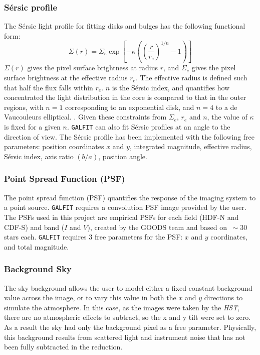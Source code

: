 \documentclass[11pt,twocolumn]{article}
\begin{document}
\subsubsection{S\'{e}rsic profile}\label{parfitting}
The S\'{e}rsic light profile for fitting disks and bulges has the following functional form: 
\begin{equation}
\Sigma(r) = \Sigma_e \exp \left[ -\kappa \left( \left(  \frac{r}{r_e} \right)^{1/n} - 1 \right) \right]
\end{equation}
$\Sigma(r)$ gives the pixel surface brightness at radius $r$, and $\Sigma_e$ gives the pixel surface brightness at the effective radius $r_e$. The effective radius is defined such that half the flux falls within $r_e$. $n$ is the S\'{e}rsic index, and quantifies how concentrated the light distribution in the core is compared to that in the outer regions, with $n=1$ corresponding to an exponential disk, and $n=4$ to a de Vaucouleurs elliptical.\cite{Peng:2002ua} . Given these constraints from  $\Sigma_e$, $r_e$ and $n$, the value of $\kappa$ is fixed for a given $n$. {\tt GALFIT} can also fit S\'{e}rsic profiles at an angle to the direction of view. The S\'{e}rsic profile has been implemented with the following free parameters: position coordinates $x$ and $y$, integrated magnitude, effective radius, S\'{e}rsic index, axis ratio $(b/a)$, position angle. 

\subsubsection{Point Spread Function (PSF) }\label{psf}
The point spread function (PSF) quantifies the response of the imaging system to a point source. {\tt GALFIT} requires a convolution PSF image provided by the user. The PSFs used in this project are empirical PSFs for each field (HDF-N and CDF-S) and band ($I$ and $V$), created by the GOODS team and based on $~\sim 30$ stars each.  {\tt GALFIT} requires 3 free parameters for the PSF: $x$ and $y$ coordinates, and total magnitude. 


\subsubsection{Background Sky}
The sky background allows the user to model either a fixed constant background value across the image, or to vary this value in both the $x$ and $y$ directions to simulate the atmosphere. In this case, as the images were taken by the \emph{HST}, there are no atmospheric effects to subtract, so the x and y tilt were set to zero. As a result the sky had only the background pixel as a free parameter. Physically, this background results from scattered light and instrument noise that has not been fully subtracted in the reduction.  
\end{document}
